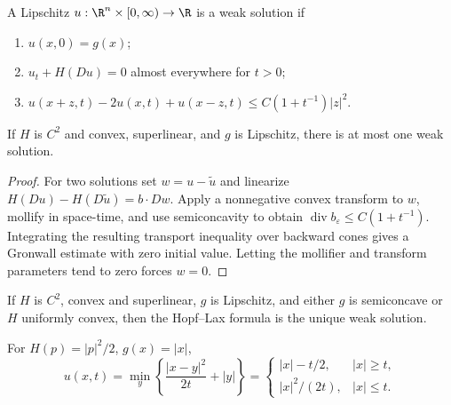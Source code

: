 \begin{definition}
\label{def:weak-solution-hamilton-jacobi}
A Lipschitz $u:\R^n\times[0,\infty)\to\R$ is a weak solution if
\begin{enumerate}
\item[(a)] $u(x,0)=g(x)$;
\item[(b)] $u_t+H(Du)=0$ almost everywhere for $t>0$;
\item[(c)] $u(x+z,t)-2u(x,t)+u(x-z,t)\le C(1+t^{-1})|z|^2$.
\end{enumerate}
\end{definition}

\begin{theorem}
\label{thm:uniqueness-weak-solutions-hj}
If $H$ is $C^2$ and convex, superlinear, and $g$ is Lipschitz, there is at
most one weak solution.
\end{theorem}

\begin{proof}
\sketch For two solutions set $w=u-\tilde u$ and linearize
$H(Du)-H(D\tilde u)=b\cdot Dw$. Apply a nonnegative convex transform to $w$,
mollify in space-time, and use semiconcavity to obtain
$\operatorname{div}b_\varepsilon\le C(1+t^{-1})$. Integrating the resulting
transport inequality over backward cones gives a Gronwall estimate with zero
initial value. Letting the mollifier and transform parameters tend to zero
forces $w=0$.
\end{proof}

\begin{theorem}
\label{thm:hopf-lax-formula-weak-solution}
If $H$ is $C^2$, convex and superlinear, $g$ is Lipschitz, and either $g$ is
semiconcave or $H$ uniformly convex, then the Hopf--Lax formula is the unique
weak solution.
\end{theorem}

\begin{example}[Explicit Hopf--Lax solution: $H(p) = \frac{1}{2}|p|^2$, $g = |x|$]
\label{ex:hopf-lax-explicit-example-i}
For $H(p)=|p|^2/2$, $g(x)=|x|$,
\[
u(x,t)=\min_y\left\{\frac{|x-y|^2}{2t}+|y|\right\}
=\begin{cases}|x|-t/2,&|x|\ge t,\\|x|^2/(2t),&|x|\le t.\end{cases}
\]
\end{example}

